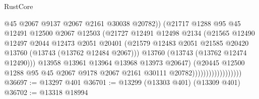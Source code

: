 \begin{lexlean}{RustCore}
\begin{coremodule}
                                        @45
                                        @2067
                                        @9137
                                        @2067
                                        @2161
                                        @30038
                                        @20782))
                                    (@21717
                                      @1288
                                      @95
                                      @45
                                      @12491
                                      @12500
                                      @2067
                                      @12503
                                      (@21727
                                        @12491
                                        @12498
                                        @2134
                                        (@21565
                                          @12490
                                          @12497
                                          @2044
                                          @12473
                                          @2051
                                          @20401
                                          (@21579
                                            @12483
                                            @2051
                                            @21585
                                            @20420
                                            @13760
                                            (@13743 (@13762 @12484 @2067)))
                                          @13760
                                          (@13743 (@13762 @12474 @12490)))
                                        @13958
                                        @13961
                                        @13964
                                        @13968
                                        @13973
                                        @20647)
                                      (@20445
                                        @12500
                                        @1288
                                        @95
                                        @45
                                        @2067
                                        @9178
                                        @2067
                                        @2161
                                        @30111
                                        @20782))))))))))))))))))
@36697 := @13297 @401
@36701 := @13299 (@13303 @401) (@13309 @401)
@36702 := @13318 @18994

\end{coremodule}
\end{lexlean}

